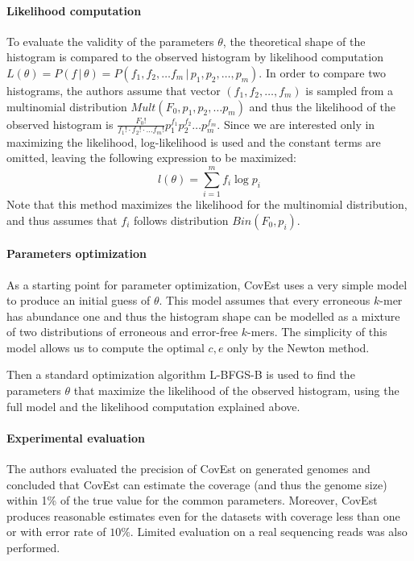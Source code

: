 \paragraph{Likelihood computation}
To evaluate the validity of the parameters $\theta$, the theoretical shape of the histogram is
compared to the observed histogram by likelihood computation
$L(\theta) = P(f\,|\,\theta) = P(f_1, f_2, \dots f_m\,|\,p_1, p_2, \dots, p_m)$. In order to
compare two histograms, the authors assume that vector $(f_1, f_2, \dots, f_m)$ is sampled
from a multinomial distribution $Mult(F_0, p_1, p_2, \dots p_m)$ and thus the
likelihood of the observed histogram is 
$\frac{F_0!}{f_1! \cdot f_2! \cdot \dots f_m!} p_1^{f_1} p_2^{f_2} \dots p_m ^{f_m}$.
Since we are interested only in maximizing the likelihood, log-likelihood is used and
the constant terms are omitted, leaving the following expression to be maximized:
\begin{equation} \label{eq:covest-likelihood}
l(\theta) = \sum_{i=1}^m f_i \log p_i
\end{equation}
Note that this method maximizes the likelihood for the multinomial distribution,
and thus assumes that $f_i$ follows distribution $Bin(F_0, p_i)$.

\paragraph{Parameters optimization}
As a starting point for parameter optimization, CovEst uses a very simple model
to produce an initial guess of $\theta$. This model assumes that every
erroneous $k$-mer has abundance one and thus the histogram shape can be modelled
as a mixture of two distributions of erroneous and error-free $k$-mers. The
simplicity of this model allows us to compute the optimal $c, e$ only by the Newton method.

Then a standard optimization algorithm L-BFGS-B is used to find the parameters $\theta$
that maximize the likelihood of the observed histogram, using the full model and the
likelihood computation explained above.

\paragraph{Experimental evaluation}
The authors evaluated the precision of CovEst on generated genomes \cite{Hozza2015}
and concluded that CovEst can estimate the coverage (and thus the genome size) within 1\% 
of the true value for the common parameters. Moreover, CovEst produces reasonable
estimates even for the datasets with coverage less than one or with error rate of $10\%$.
Limited evaluation on a real sequencing reads was also performed.